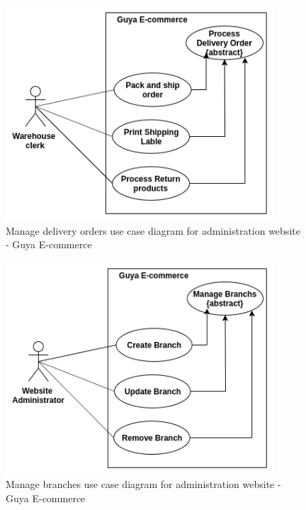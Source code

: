 \begin{figure}[!ht]
\centering
\includegraphics[width=10cm,keepaspectratio]{usecases/manage_delivery_order}
\caption{Manage delivery orders use case diagram for administration website - Guya E-commerce}
\end{figure}
\clearpage
\begin{figure}[!ht]
\centering
\includegraphics[width=10cm,keepaspectratio]{usecases/manage_branchs}
\caption{Manage branches use case diagram for administration website - Guya E-commerce}
\end{figure}

